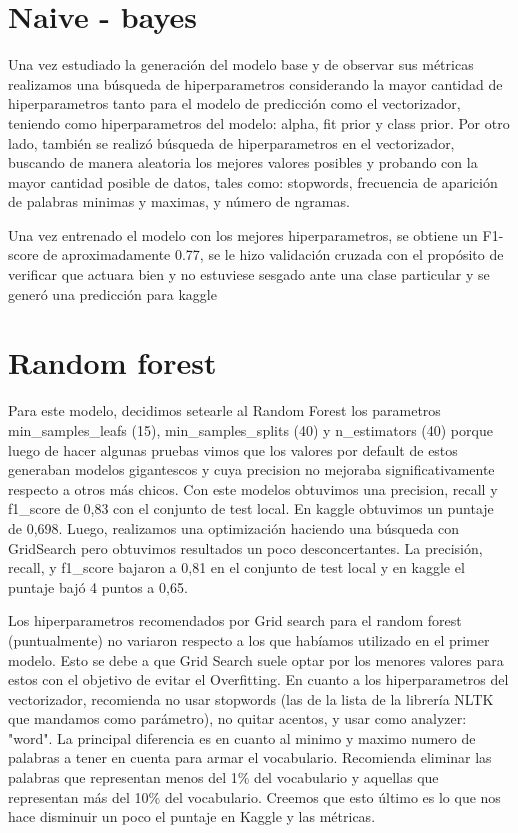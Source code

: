 \documentclass{article}
\begin{document}
\section*{Naive - bayes}

Una vez estudiado la generación del modelo base y de observar sus métricas realizamos una búsqueda de hiperparametros considerando la mayor cantidad de hiperparametros tanto para el modelo de predicción como el vectorizador, teniendo como hiperparametros del modelo:
alpha, fit prior y class prior. Por otro lado, también se realizó búsqueda de hiperparametros en el vectorizador, buscando de manera aleatoria los mejores valores posibles y probando con la mayor cantidad posible de datos, tales como: stopwords, frecuencia de aparición de palabras minimas y maximas, y número de ngramas. 

Una vez entrenado el modelo con los mejores hiperparametros, se obtiene un F1-score de aproximadamente 0.77, se le hizo validación cruzada con el propósito de verificar que actuara bien y no estuviese sesgado ante una clase particular y se generó una predicción para kaggle 

\section*{Random forest}
Para este modelo, decidimos setearle al Random Forest los parametros min\_samples\_leafs (15),  min\_samples\_splits (40) y n\_estimators (40) porque luego de hacer algunas pruebas vimos que los valores por default de estos generaban modelos gigantescos y cuya precision no mejoraba significativamente respecto a otros más chicos. Con este modelos obtuvimos una precision, recall y f1\_score de 0,83 con el conjunto de test local. En kaggle obtuvimos un puntaje de 0,698.
Luego, realizamos una optimización haciendo una búsqueda con GridSearch pero obtuvimos resultados un poco desconcertantes. La precisión, recall, y f1\_score bajaron a 0,81 en el conjunto de test local y en kaggle el puntaje bajó 4 puntos  a 0,65. 

Los hiperparametros recomendados por Grid search para el random forest (puntualmente) no variaron respecto a los que habíamos utilizado en el primer modelo. Esto se debe a que Grid Search suele optar por los menores valores para estos con el objetivo de evitar el Overfitting. 
En cuanto a los hiperparametros del vectorizador, recomienda no usar stopwords (las de la lista de la librería NLTK que mandamos como parámetro), no quitar acentos, y usar como analyzer: "word". La principal diferencia es en cuanto al minimo y maximo numero de palabras a tener en cuenta para armar el vocabulario. Recomienda eliminar las palabras que representan menos del 1\% del vocabulario y aquellas que representan más del 10\% del vocabulario. Creemos que esto último es lo que nos hace disminuir un poco el puntaje en Kaggle y las métricas.
\end{document}
